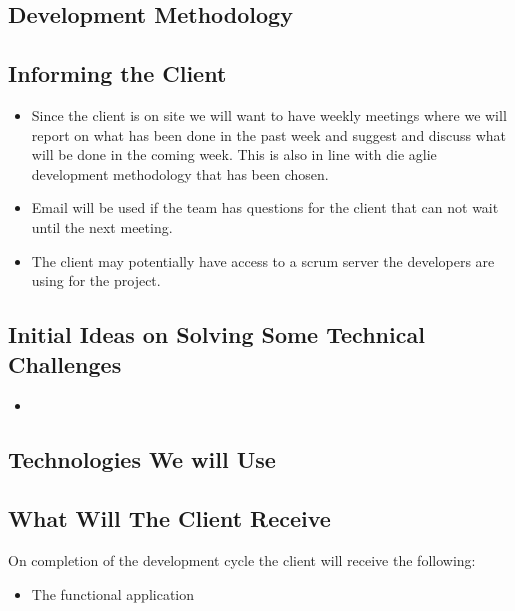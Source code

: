 \subsection{Development Methodology}


\subsection{Informing the Client}
\begin{itemize}
	\item Since the client is on site we will want to have weekly meetings where we will report on what has been done in the past week and suggest and discuss what will be done in the coming week. This is also in line with die aglie development methodology that has been chosen.
	\item Email will be used if the team has questions for the client that can not wait until the next meeting.
	\item The client may potentially have access to a scrum server the developers are using for the project.
\end{itemize}

\subsection{Initial Ideas on Solving Some Technical Challenges}
\begin{itemize}
	\item 
\end{itemize}

\subsection{Technologies We will Use}

\subsection{What Will The Client Receive}
On completion of the development cycle the client will receive the following:
\begin{itemize}
	\item The functional application
\end{itemize}
